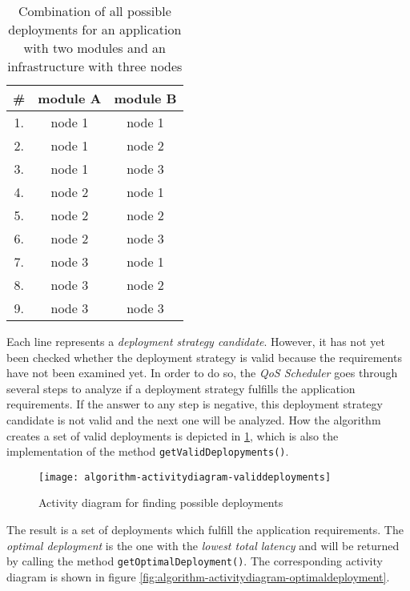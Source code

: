 \begin{table}[htb]
    \centering
    \begin{tabular}{|c||c|c|}
    \hline
        \# & \textbf{module A} & \textbf{module B}\\
         \hline\hline
         1. & node 1 & node 1\\
         \hline
         2. & node 1 & node 2\\
         \hline
         3. & node 1 & node 3\\
         \hline
         4. & node 2 & node 1\\
         \hline
         5. & node 2 & node 2\\
         \hline
         6. & node 2 & node 3\\
         \hline
         7. & node 3 & node 1\\
         \hline
         8. & node 3 & node 2\\
         \hline
         9. & node 3 & node 3\\
         \hline
    \end{tabular}
    \caption{Combination of all possible deployments for an application with two modules and an infrastructure with three nodes}
    \label{tab:deployment-combinations}
\end{table}

Each line represents a \textit{deployment strategy candidate}.
However, it has not yet been checked whether the deployment strategy is valid because the requirements have not been examined yet.
In order to do so, the \textit{QoS Scheduler} goes through several steps to analyze if a deployment strategy fulfills the application requirements.
If the answer to any step is negative, this deployment strategy candidate is not valid and the next one will be analyzed.
How the algorithm creates a set of valid deployments is depicted in \ref{fig:algorithm-activitydiagram-validdeployments}, which is also the implementation of the method \texttt{getValidDeplopyments()}.

\begin{figure}[htb]
    \centering
    \texttt{[image: algorithm-activitydiagram-validdeployments]}
    \caption{Activity diagram for finding possible deployments}
    \label{fig:algorithm-activitydiagram-validdeployments}
\end{figure}

The result is a set of deployments which fulfill the application requirements.
The \textit{optimal deployment} is the one with the \textit{lowest total latency} and will be returned by calling the method \texttt{getOptimalDeployment()}.
The corresponding activity diagram is shown in figure \ref{fig:algorithm-activitydiagram-optimaldeployment}.

